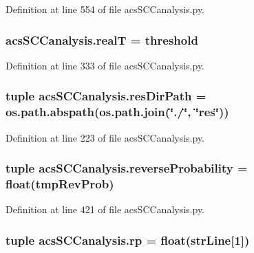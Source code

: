 Definition at line 554 of file acs\-S\-C\-Canalysis.\-py.

\hypertarget{a00102_a1c9b45f6074222ace96b7ab38cb8e23b}{
\subsubsection[{real\-T}]{\setlength{\rightskip}{0pt plus 5cm}acs\-S\-C\-Canalysis.\-real\-T = {\bf threshold}}}\label{a00102_a1c9b45f6074222ace96b7ab38cb8e23b}


Definition at line 333 of file acs\-S\-C\-Canalysis.\-py.

\hypertarget{a00102_a9ededb3cd7c63befde39ad68e5f9e006}{
\subsubsection[{res\-Dir\-Path}]{\setlength{\rightskip}{0pt plus 5cm}tuple acs\-S\-C\-Canalysis.\-res\-Dir\-Path = os.\-path.\-abspath(os.\-path.\-join(\char`\"{}./\char`\"{}, \char`\"{}res\char`\"{}))}}\label{a00102_a9ededb3cd7c63befde39ad68e5f9e006}


Definition at line 223 of file acs\-S\-C\-Canalysis.\-py.

\hypertarget{a00102_aa7db2dba66810044f9c5238eccc995b7}{
\subsubsection[{reverse\-Probability}]{\setlength{\rightskip}{0pt plus 5cm}tuple acs\-S\-C\-Canalysis.\-reverse\-Probability = float(tmp\-Rev\-Prob)}}\label{a00102_aa7db2dba66810044f9c5238eccc995b7}


Definition at line 421 of file acs\-S\-C\-Canalysis.\-py.

\hypertarget{a00102_a98150f532e09ebae495212500d2f1799}{
\subsubsection[{rp}]{\setlength{\rightskip}{0pt plus 5cm}tuple acs\-S\-C\-Canalysis.\-rp = float({\bf str\-Line}\mbox{[}1\mbox{]})}}\label{a00102_a98150f532e09ebae495212500d2f1799}


